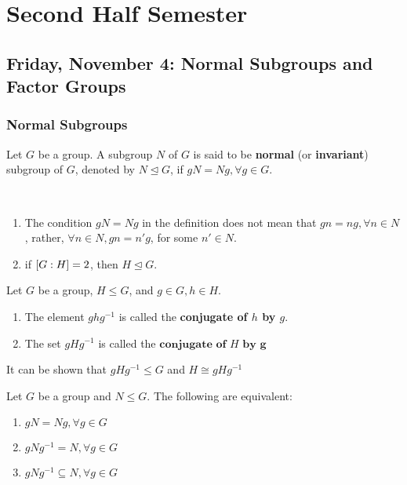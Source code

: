 \section{Second Half Semester}
\subsection{Friday, November 4: Normal Subgroups and Factor Groups}
\subsubsection{Normal Subgroups}

\begin{definition}
    Let $G$ be a group. A subgroup $N$ of $G$ is said to be \textbf{normal} (or \textbf{invariant}) subgroup of $G$, denoted by $N \unlhd G$, if $gN = Ng, \forall g \in G$.
\end{definition}

\begin{remark} \phantom{blank} \\
    \begin{enumerate}
        \item The condition $gN = Ng$ in the definition does not mean that $gn = ng, \forall n \in N$, rather, $\forall n \in N, gn = n'g$, for some $n' \in N$.
        \item if $\qty[G:H] = 2$, then $H \unlhd G$.
    \end{enumerate}
\end{remark}

\begin{definition}
    Let $G$ be a group, $H \leq G$, and $g \in G, h \in H$.
    \begin{enumerate}
        \item The element $ghg^{-1}$ is called the \textbf{conjugate of $h$ by $g$}.
        \item The set $gHg^{-1}$ is called the $\textbf{conjugate of $H$ by g}$
    \end{enumerate}
\end{definition}

\begin{remark}
    It can be shown that $gHg^{-1} \leq G$ and $H \cong gHg^{-1}$
\end{remark}

\begin{theorem}
    Let $G$ be a group and $N \leq G$. The following are equivalent:
    \begin{enumerate}
        \item $gN = Ng, \forall g \in G$
        \item $gNg^{-1} = N, \forall g \in G$
        \item $gNg^{-1} \subseteq N, \forall g \in G$
    \end{enumerate}
\end{theorem}

